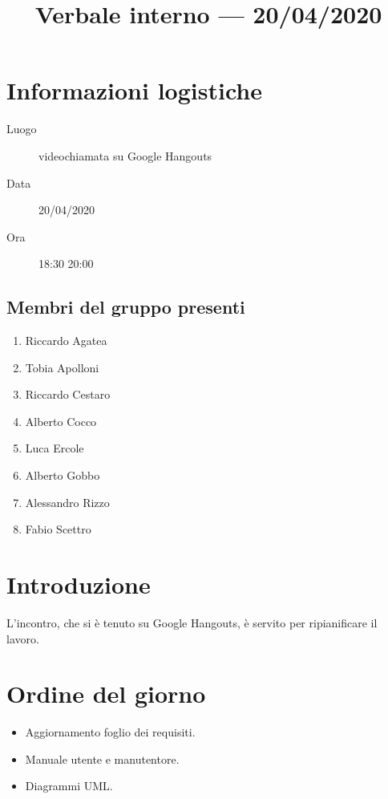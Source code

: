 \documentclass{article}
\title{Verbale interno --- 20/04/2020}
\begin{document}


\section{Informazioni logistiche}%
\label{sec:informazioni_logistiche}

\begin{description}
  \item [Luogo] videochiamata su Google Hangouts
  \item [Data] 20/04/2020
  \item [Ora] 18:30  20:00
\end{description}

\subsection{Membri del gruppo presenti}%
\label{sub:membri_del_gruppo_presenti}

\begin{enumerate}
  \item Riccardo Agatea
  \item Tobia Apolloni
  \item Riccardo Cestaro
  \item Alberto Cocco
  \item Luca Ercole
  \item Alberto Gobbo
  \item Alessandro Rizzo
  \item Fabio Scettro
\end{enumerate}

\section{Introduzione}%
\label{sec:introduzione}

L'incontro, che si è tenuto su Google Hangouts, è servito per ripianificare il lavoro.

\section{Ordine del giorno}%
\label{sec:ordine_del_giorno}
\begin{itemize}
  \item Aggiornamento foglio dei requisiti.
  \item Manuale utente e manutentore.
  \item Diagrammi UML.
\end{itemize}
\end{document}
